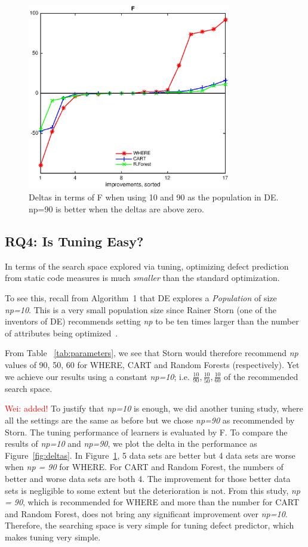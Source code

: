 \documentclass{sig-alternative}
\newcommand{\wei}[1]{\textcolor{red}{Wei: #1}}
\newcommand{\fig}[1]{Figure~\ref{fig:#1}}
\newcommand{\tab}[1]{Table ~\ref{tab:#1}}
\begin{document}
\begin{figure}[!b]
\includegraphics[width=3.5in,left]{np_10_90.eps}
\caption{Deltas in terms of F when using 10 and 90 as the population in DE. np=90 is better when the deltas are above zero.}\label{fig:deltas_np}
 \end{figure}


\subsection{RQ4: Is Tuning Easy?}\label{sect:easy}

In terms of the search space
explored via tuning, optimizing defect prediction from static code
measures is much {\em smaller} than the standard optimization.

To see this,
recall from Algorithm~1 that
DE explores a {\em Population} of size {\em np=10}. This is a very small population size since
Rainer Storn (one of the inventors of DE) recommends  setting {\em np} to be ten times larger than the number
of attributes being optimized~\cite{storn1997differential}.

From \tab{parameters},
we see that Storn would therefore recommend {\em np} values of
90, 50, 60 for WHERE, CART and Random Forests (respectively). Yet we achieve our results
using a constant {\em np=10}; i.e. $\frac{10}{90}, \frac{10}{50}, \frac{10}{60}$ of the
recommended search space.

\wei{added!} To justify that {\em np=10} is enough, we did another tuning study, 
where all the settings are the same as before but we chose {\em np=90} as recommended by Storn. 
The tuning performance of learners is evaluated
by F. To compare the results of {\em np=10} and {\em np=90}, we plot the delta in the performance as \fig{deltas}. In \fig{deltas_np}, 5 data sets are better but 4 data sets are worse when {\em np = 90} for WHERE. For CART and Random Forest, the numbers of better and worse data sets are both 4. The improvement for those better data sets is negligible to some extent but the deterioration is not. From this study, {\em np = 90}, which is recommended for WHERE and more than the number for CART and Random Forest, does not bring any significant improvement over {\em np=10}. Therefore, the searching space is very simple for tuning defect predictor, which makes tuning very simple.
\end{document}
